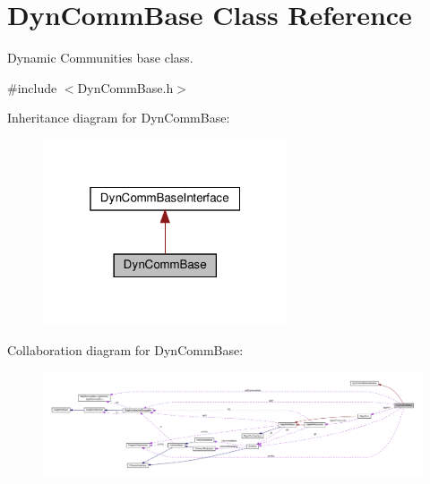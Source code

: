 \hypertarget{classDynCommBase}{}\section{Dyn\+Comm\+Base Class Reference}
\label{classDynCommBase}


Dynamic Communities base class.  




{\ttfamily \#include $<$Dyn\+Comm\+Base.\+h$>$}



Inheritance diagram for Dyn\+Comm\+Base\+:
\nopagebreak
\begin{figure}[H]
\begin{center}
\leavevmode
\includegraphics[width=205pt]{classDynCommBase__inherit__graph}
\end{center}
\end{figure}


Collaboration diagram for Dyn\+Comm\+Base\+:
\nopagebreak
\begin{figure}[H]
\begin{center}
\leavevmode
\includegraphics[width=350pt]{classDynCommBase__coll__graph}
\end{center}
\end{figure}
